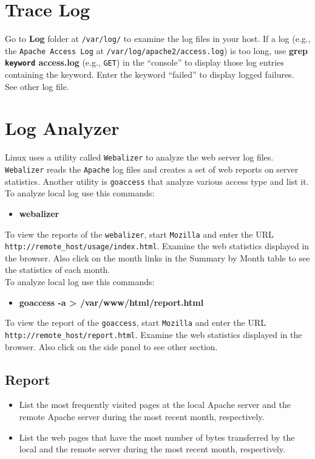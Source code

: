 \documentclass[10pt,a4paper]{article}
\numberwithin{equation}{section}
\numberwithin{figure}{section}
\numberwithin{table}{section}
\begin{document}
\section{Trace Log}
	Go to \textbf{Log} folder at \texttt{/var/log/} to examine the log files in your host. If a log (e.g., the \texttt{Apache Access Log} at \texttt{/var/log/apache2/access.log}) is too long, use \textbf{grep \texttt{keyword} access.log} (e.g., \texttt{GET}) in the “console” to display those log entries containing the keyword. Enter the keyword “failed” to display logged failures.\\
	See other log file.

\section{Log Analyzer}
	Linux uses a utility called \texttt{Webalizer} to analyze the web server log files. \texttt{Webalizer} reads the \texttt{Apache} log files and creates a set of web reports on server statistics. Another utility is \texttt{goaccess} that analyze various access type and list it.\\
	To analyze local log use this commands:
	\begin{itemize}
		\item \textbf{webalizer}
	\end{itemize}
	To view the reports of the \texttt{webalizer}, start \texttt{Mozilla} and enter the URL \texttt{http://remote\_host/usage/index.html}. Examine the web statistics displayed in the browser. Also click on the month links in the Summary by Month table to see the statistics of each month.\\
	To analyze local log use this commands:
	\begin{itemize}
		\item \textbf{goaccess -a > /var/www/html/report.html}
	\end{itemize}
	To view the report of the \texttt{goaccess}, start \texttt{Mozilla} and enter the URL \texttt{http://remote\_host/report.html}. Examine the web statistics displayed in the browser. Also click on the side panel to see other section.

	\subsection*{Report}
	\begin{itemize}
		\item List the most frequently visited pages at the local Apache server and 		the remote Apache server during the most recent month, respectively.
		\item List the web pages that have the most number of bytes transferred by the local and the remote server during the most recent month, respectively.
	\end{itemize}
\end{document}
